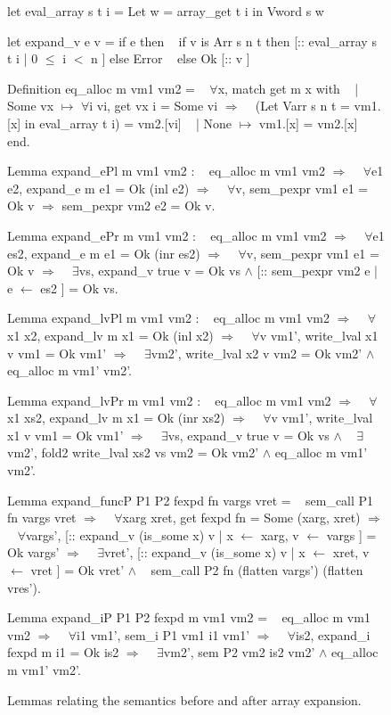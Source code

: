 \documentclass{article}
\begin{document}
\begin{figure}[p]
\obeylines\obeyspaces\ttfamily%
let eval\_array s t i = Let w = array\_get t i in Vword s w

let expand\_v e v = if e then
~   if v is Arr s n t then [:: eval\_array s t i | 0 \(\leq\) i \(<\) n ] else Error
~ else Ok [:: v ]

Definition eq\_alloc m vm1 vm2 =
~ \(\forall\)x, match get m x with
~ | Some vx \(\mapsto\) \(\forall\)i vi, get vx i = Some vi \(\Longrightarrow\)
~   (Let Varr s n t = vm1.[x] in eval\_array t i) = vm2.[vi]
~ | None \(\mapsto\) vm1.[x] = vm2.[x]
~ end.

Lemma expand\_ePl m vm1 vm2 :
~ eq\_alloc m vm1 vm2 \(\Longrightarrow\)
~ \(\forall\)e1 e2, expand\_e m e1 = Ok (inl e2) \(\Longrightarrow\)
~ \(\forall\)v, sem\_pexpr vm1 e1 = Ok v \(\Longrightarrow\) sem\_pexpr vm2 e2 = Ok v.

Lemma expand\_ePr m vm1 vm2 :
~ eq\_alloc m vm1 vm2 \(\Longrightarrow\)
~ \(\forall\)e1 es2, expand\_e m e1 = Ok (inr es2) \(\Longrightarrow\)
~ \(\forall\)v, sem\_pexpr vm1 e1 = Ok v \(\Longrightarrow\)
~ \(\exists\)vs, expand\_v true v = Ok vs \(\wedge\) [:: sem\_pexpr vm2 e | e \(\gets\) es2 ] = Ok vs.

Lemma expand\_lvPl m vm1 vm2 :
~ eq\_alloc m vm1 vm2 \(\Longrightarrow\)
~ \(\forall\)x1 x2, expand\_lv m x1 = Ok (inl x2) \(\Longrightarrow\)
~ \(\forall\)v vm1', write\_lval x1 v vm1 = Ok vm1' \(\Longrightarrow\)
~ \(\exists\)vm2', write\_lval x2 v vm2 = Ok vm2' \(\wedge\) eq\_alloc m vm1' vm2'.

Lemma expand\_lvPr m vm1 vm2 :
~ eq\_alloc m vm1 vm2 \(\Longrightarrow\)
~ \(\forall\)x1 xs2, expand\_lv m x1 = Ok (inr xs2) \(\Longrightarrow\)
~ \(\forall\)v vm1', write\_lval x1 v vm1 = Ok vm1' \(\Longrightarrow\)
~ \(\exists\)vs, expand\_v true v = Ok vs \(\wedge\)
~   \(\exists\)vm2', fold2 write\_lval xs2 vs vm2 = Ok vm2' \(\wedge\) eq\_alloc m vm1' vm2'.

Lemma expand\_funcP P1 P2 fexpd fn vargs vret =
~ sem\_call P1 fn vargs vret \(\Longrightarrow\)
~ \(\forall\)xarg xret, get fexpd fn = Some (xarg, xret) \(\Longrightarrow\)
~ \(\forall\)vargs', [:: expand\_v (is\_some x) v | x \(\gets\) xarg, v \(\gets\) vargs ] = Ok vargs' \(\Longrightarrow\)
~ \(\exists\)vret',  [:: expand\_v (is\_some x) v | x \(\gets\) xret, v \(\gets\) vret  ] = Ok vret' \(\wedge\)
~   sem\_call P2 fn (flatten vargs') (flatten vres').

Lemma expand\_iP P1 P2 fexpd m vm1 vm2 =
~ eq\_alloc m vm1 vm2 \(\Longrightarrow\)
~ \(\forall\)i1 vm1', sem\_i P1 vm1 i1 vm1' \(\Longrightarrow\)
~ \(\forall\)is2, expand\_i fexpd m i1 = Ok is2 \(\Longrightarrow\)
~ \(\exists\)vm2', sem P2 vm2 is2 vm2' \(\wedge\) eq\_alloc m vm1' vm2'.
\normalfont%
\caption{Lemmas relating the semantics before and after array expansion.}\label{fig:semlem}
\end{figure}
\end{document}
